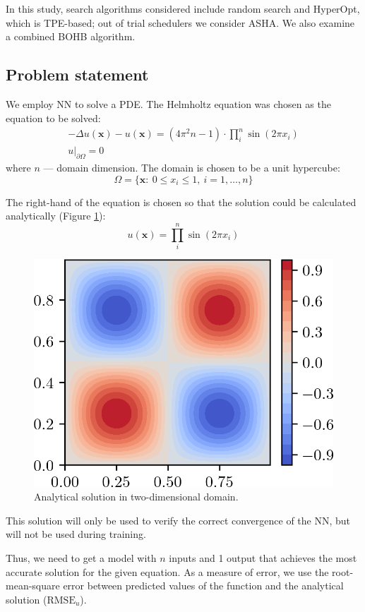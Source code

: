\documentclass[reprint,
superscriptaddress,
amsmath,amssymb,aps,showkeys,showpacs,
twoside,final,secnumarabic,%
nofootinbib]{revtex4-2}
\begin{document}
In this study, search algorithms considered include random search and HyperOpt, which is TPE-based; out of trial schedulers we consider ASHA. We also examine a combined BOHB algorithm.

\subsection{Problem statement}
We employ NN to solve a PDE. The Helmholtz equation was chosen as the equation to be solved:
\begin{gather*}
-\Delta u(\mathbf{x}) - u(\mathbf{x}) = (4 \pi^2 n - 1) \cdot \prod \limits_i^n \sin (2 \pi x_i)\\
u|_{\partial \Omega} = 0
\end{gather*}
where $n$ — domain dimension. The domain is chosen to be a unit hypercube:
\[\Omega = \lbrace \mathbf{x}: \: 0 \leq x_i \leq 1, \: i = 1, \ldots, n \rbrace\]

The right-hand of the equation is chosen so that the solution could be calculated analytically (Figure \ref{analytical_solution}):
\[u(\mathbf{x}) = \prod \limits_i^n \sin (2 \pi x_i)\]
\begin{figure}[h]
\includegraphics{img/analytical solution.png}
\caption{Analytical solution in two-dimensional domain.}
\label{analytical_solution}
\end{figure}

This solution will only be used to verify the correct convergence of the NN, but will not be used during training.

Thus, we need to get a model with $n$ inputs and 1 output that achieves the most accurate solution for the given equation. As a measure of error, we use the root-mean-square error between predicted values of the function and the analytical solution ($\mathrm{RMSE}_u$).
\end{document}
